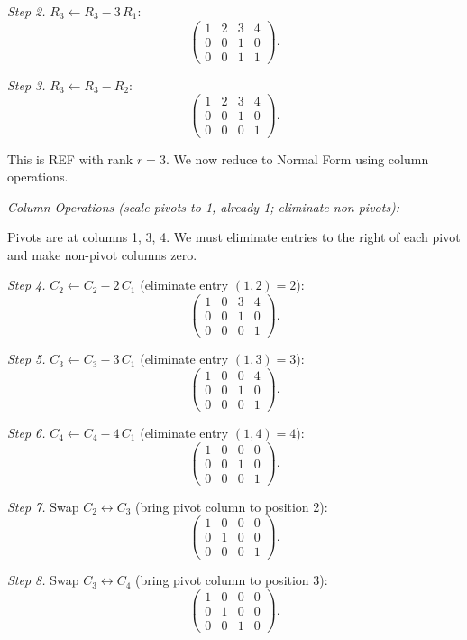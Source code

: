 \documentclass[12pt,a4paper]{article}
\begin{document}
\textit{Step 2.} $R_3 \leftarrow R_3 - 3\,R_1$:
\[
\begin{pmatrix} 1 & 2 & 3 & 4 \\ 0 & 0 & 1 & 0 \\ 0 & 0 & 1 & 1 \end{pmatrix}.
\]

\textit{Step 3.} $R_3 \leftarrow R_3 - R_2$:
\[
\begin{pmatrix} 1 & 2 & 3 & 4 \\ 0 & 0 & 1 & 0 \\ 0 & 0 & 0 & 1 \end{pmatrix}.
\]

This is REF with rank $r = 3$. We now reduce to Normal Form using column operations.

\textit{Column Operations (scale pivots to 1, already 1; eliminate non-pivots):}

Pivots are at columns 1, 3, 4. We must eliminate entries to the right of each pivot and make non-pivot columns zero.

\textit{Step 4.} $C_2 \leftarrow C_2 - 2\,C_1$ (eliminate entry $(1,2)=2$):
\[
\begin{pmatrix} 1 & 0 & 3 & 4 \\ 0 & 0 & 1 & 0 \\ 0 & 0 & 0 & 1 \end{pmatrix}.
\]

\textit{Step 5.} $C_3 \leftarrow C_3 - 3\,C_1$ (eliminate entry $(1,3)=3$):
\[
\begin{pmatrix} 1 & 0 & 0 & 4 \\ 0 & 0 & 1 & 0 \\ 0 & 0 & 0 & 1 \end{pmatrix}.
\]

\textit{Step 6.} $C_4 \leftarrow C_4 - 4\,C_1$ (eliminate entry $(1,4)=4$):
\[
\begin{pmatrix} 1 & 0 & 0 & 0 \\ 0 & 0 & 1 & 0 \\ 0 & 0 & 0 & 1 \end{pmatrix}.
\]

\textit{Step 7.} Swap $C_2 \leftrightarrow C_3$ (bring pivot column to position 2):
\[
\begin{pmatrix} 1 & 0 & 0 & 0 \\ 0 & 1 & 0 & 0 \\ 0 & 0 & 0 & 1 \end{pmatrix}.
\]

\textit{Step 8.} Swap $C_3 \leftrightarrow C_4$ (bring pivot column to position 3):
\[
\begin{pmatrix} 1 & 0 & 0 & 0 \\ 0 & 1 & 0 & 0 \\ 0 & 0 & 1 & 0 \end{pmatrix}.
\]
\end{document}
